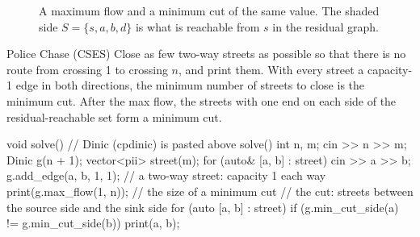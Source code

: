 \begin{figure}[htbp]
\centering
{}
\caption{A maximum flow and a minimum cut of the same value. The shaded side $S = \{s, a, b, d\}$ is what is reachable from $s$
in the residual graph.}
\label{fig:mincut}
\end{figure}

\begin{problem}{Police Chase (CSES)}
Close as few two-way streets as possible so that there is no route from crossing 1 to crossing $n$, and print them.
\solution With every street a capacity-1 edge in both directions, the minimum number of streets to close is the minimum cut. After
the max flow, the streets with one end on each side of the residual-reachable set form a minimum cut.
\end{problem}

\begin{code}
void solve() {  // Dinic (cpdinic) is pasted above solve()
    int n, m;
    cin >> n >> m;
    Dinic g(n + 1);
    vector<pii> street(m);
    for (auto& [a, b] : street) {
        cin >> a >> b;
        g.add_edge(a, b, 1, 1);  // a two-way street: capacity 1 each way
    }
    print(g.max_flow(1, n));  // the size of a minimum cut
    // the cut: streets between the source side and the sink side
    for (auto [a, b] : street)
        if (g.min_cut_side(a) != g.min_cut_side(b)) print(a, b);
}
\end{code}


